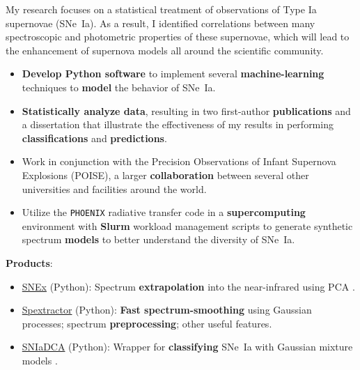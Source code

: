 \documentclass[letterpaper,11pt]{article}
\newcommand{\smallHeading}[1]{\small{\textbf{#1}:\vspace{-5pt}}}
\newcommand{\emphasize}[1]{\textbf{#1}}
\begin{document}
    \vspace{5pt}
    \hspace*{0.85em}
    \begin{minipage}{0.95\textwidth}
    My research focuses on a statistical treatment of observations of Type Ia
    supernovae (SNe~Ia). As a result, I identified correlations between many
    spectroscopic and photometric properties of these supernovae, which will
    lead to the enhancement of supernova models all around the scientific
    community.
    \end{minipage}
    \begin{itemize}\small
      \item \emphasize{Develop Python software} to implement several
        \emphasize{machine-learning} techniques to \emphasize{model} the
        behavior of SNe~Ia.
      \item \emphasize{Statistically analyze data}, resulting in two
        first-author \emphasize{publications} and a dissertation that
        illustrate the effectiveness of my results in performing
        \emphasize{classifications} and \emphasize{predictions}.
      \item Work in conjunction with the Precision Observations of Infant
        Supernova Explosions (POISE), a larger \emphasize{collaboration}
        between several other universities and facilities around the world.
      \item Utilize the \texttt{PHOENIX} radiative transfer code in a
        \emphasize{supercomputing} environment with \emphasize{Slurm} workload
        management scripts to generate synthetic spectrum \emphasize{models} to
        better understand the diversity of SNe~Ia.
    \end{itemize}
    \hspace*{1.1em}\smallHeading{Products}
    \begin{itemize}\small
      \item \href{https://github.com/anthonyburrow/SNEx}{SNEx} (Python):
        Spectrum \emphasize{extrapolation} into the near-infrared using PCA
        \citep{Burrow_etal_2024}.
      \item \href{https://github.com/anthonyburrow/spextractor}{Spextractor} (Python):
        \emphasize{Fast spectrum-smoothing} using Gaussian processes; spectrum
        \emphasize{preprocessing}; other useful features.
      \item \href{https://github.com/anthonyburrow/SNIaDCA}{SNIaDCA} (Python):
        Wrapper for \emphasize{classifying} SNe~Ia with Gaussian mixture models
        \citep{Burrow_etal_2020}.
    \end{itemize}\vspace{-5pt}
\end{document}
